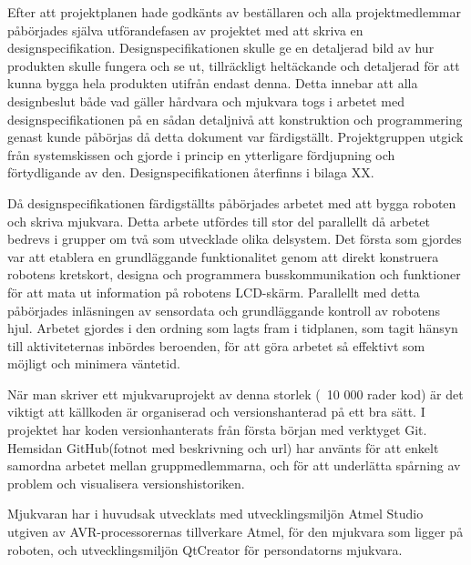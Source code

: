 Efter att projektplanen hade godkänts av beställaren och alla projektmedlemmar påbörjades själva utförandefasen av projektet med att skriva en designspecifikation. Designspecifikationen skulle ge en detaljerad bild av hur produkten skulle fungera och se ut, tillräckligt heltäckande och detaljerad för att kunna bygga hela produkten utifrån endast denna. Detta innebar att alla designbeslut både vad gäller hårdvara och mjukvara togs i arbetet med designspecifikationen på en sådan detaljnivå att konstruktion och programmering genast kunde påbörjas då detta dokument var färdigställt. Projektgruppen utgick från systemskissen och gjorde i princip en ytterligare fördjupning och förtydligande av den. Designspecifikationen återfinns i bilaga XX.

Då designspecifikationen färdigställts påbörjades arbetet med att bygga roboten och skriva mjukvara. Detta arbete utfördes till stor del parallellt då arbetet bedrevs i grupper om två som utvecklade olika delsystem. Det första som gjordes var att etablera en grundläggande funktionalitet genom att direkt konstruera robotens kretskort, designa och programmera busskommunikation och funktioner för att mata ut information på robotens LCD-skärm. Parallellt med detta påbörjades inläsningen av sensordata och grundläggande kontroll av robotens hjul. Arbetet gjordes i den ordning som lagts fram i tidplanen, som tagit hänsyn till aktiviteternas inbördes beroenden, för att göra arbetet så effektivt som möjligt och minimera väntetid. 

När man skriver ett mjukvaruprojekt av denna storlek (~10 000 rader kod) är det viktigt att källkoden är organiserad och versionshanterad på ett bra sätt. I projektet har koden versionhanterats från första början med verktyget Git. Hemsidan GitHub(fotnot med beskrivning och url) har använts för att enkelt samordna arbetet mellan gruppmedlemmarna, och för att underlätta spårning av problem och visualisera versionshistoriken.

Mjukvaran har i huvudsak utvecklats med utvecklingsmiljön Atmel Studio utgiven av AVR-processorernas tillverkare Atmel, för den mjukvara som ligger på roboten, och utvecklingsmiljön QtCreator för persondatorns mjukvara.